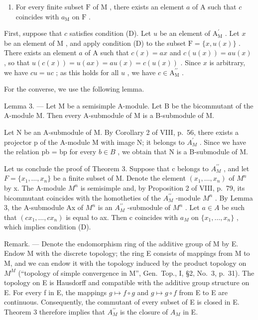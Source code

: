 \begin{enumerate}
\def\labelenumi{(\Alph{enumi})}
\setcounter{enumi}{3}
\tightlist
\item
  For every finite subset \(\mathrm{F}\) of \(\mathrm{M}\) , there exists an element \(a\) of \(\mathrm{A}\) such that \(c\) coincides with \(a_{\mathrm{M}}\) on \(\mathrm{F}\) .
\end{enumerate}

First, suppose that \(c\) satisfies condition (D). Let \(u\) be an element of \(\mathrm{A}_{\mathrm{M}}^{\prime}\) . Let \(x\) be an element of \(\mathrm{M}\) , and apply condition (D) to the subset \(\mathrm{F} = \{x, u(x)\}\) . There exists an element \(a\) of \(\mathrm{A}\) such that \(c(x) = ax\) and \(c(u(x)) = au(x)\) , so that \(u(c(x)) = u(ax) = au(x) = c(u(x))\) . Since \(x\) is arbitrary, we have \(cu = uc\) ; as this holds for all \(u\) , we have \(c \in \mathrm{A}_{\mathrm{M}}^{\prime \prime}\) .

For the converse, we use the following lemma.

Lemma 3. --- Let M be a semisimple A-module. Let B be the bicommutant of the A-module M. Then every A-submodule of M is a B-submodule of M.

Let N be an A-submodule of M. By Corollary 2 of VIII, p.~56, there exists a projector p of the A-module M with image N; it belongs to \(A_{M}^{\prime}\) . Since we have the relation pb = bp for every \(b \in B\) , we obtain that N is a B-submodule of M.

Let us conclude the proof of Theorem 3. Suppose that c belongs to \(A_{M}^{\prime\prime}\) , and let \(F = \{x_{1}, \ldots, x_{n}\}\) be a finite subset of M. Denote the element \((x_{1}, \ldots, x_{n})\) of \(M^{n}\) by x. The A-module \(M^{n}\) is semisimple and, by Proposition 2 of VIII, p.~79, its bicommutant coincides with the homotheties of the \(A_{M}^{\prime\prime}\) -module \(M^{n}\) . By Lemma 3, the A-submodule Ax of \(M^{n}\) is an \(A_{M}^{\prime\prime}\) -submodule of \(M^{n}\) . Let \(a \in A\) be such that \((cx_{1}, \ldots, cx_{n})\) is equal to ax. Then c coincides with \(a_{M}\) on \(\{x_{1}, \ldots, x_{n}\}\) , which implies condition (D).

Remark. --- Denote the endomorphism ring of the additive group of M by E. Endow M with the discrete topology; the ring E consists of mappings from M to M, and we can endow it with the topology induced by the product topology on \(M^{M}\) (``topology of simple convergence in M'', Gen.~Top., I, §2, No.~3, p.~31). The topology on E is Hausdorff and compatible with the additive group structure on E. For every f in E, the mappings \(g \mapsto f \circ g\) and \(g \mapsto g \circ f\) from E to E are continuous. Consequently, the commutant of every subset of E is closed in E. Theorem 3 therefore implies that \(A_{M}^{\prime\prime}\) is the closure of \(A_{M}\) in E.

